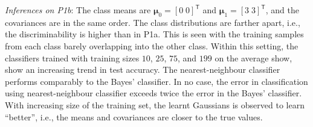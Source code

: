 \documentclass[11pt, a4 paper]{article}
\newcommand{\TT}{\mathsf{T}}
\newcommand{\bmu}{\boldsymbol{\mu}}
\begin{document}
{\it Inferences on P1b}: The class means are $\bmu_{0} = [0 \; 0]^{\TT}$ and $\bmu_{1} = [3 \; 3]^{\TT}$, and the covariances are in the same order. The class distributions are farther apart, i.e., the discriminability is higher than in P1a. This is seen with the training samples from each class barely overlapping into the other class. Within this setting, the classifiers trained with training sizes $10$, $25$, $75$, and $199$ on the average show, show an increasing trend in test accuracy. The nearest-neighbour classifier performs comparably to the Bayes' classifier. In no case, the error in classification using nearest-neighbour classifier exceeds twice the error in the Bayes' classifier. With increasing size of the training set, the learnt Gaussians is observed to learn ``better'', i.e., the means and covariances are closer to the true values.
\end{document}
